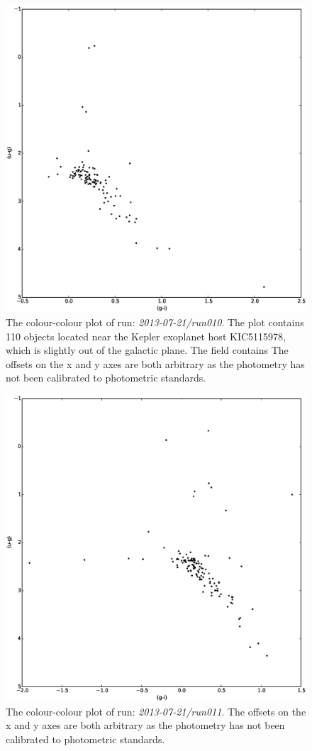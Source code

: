 \begin{figure}
\centering
\includegraphics[width=120mm]{images/2013-07-21-run010-2colour.eps}
\caption{The colour-colour plot of run: \emph{2013-07-21/run010}. The plot contains 110 objects located near the Kepler exoplanet host KIC5115978, which is slightly out of the galactic plane. The field contains The offsets on the x and y axes are both arbitrary as the photometry has not been calibrated to photometric standards.}
\label{fig:differentialtrad}
\end{figure}

\begin{figure}
\centering
\includegraphics[width=120mm]{images/2013-07-21-run011-2colour.eps}
\caption{The colour-colour plot of run: \emph{2013-07-21/run011}. The offsets on the x and y axes are both arbitrary as the photometry has not been calibrated to photometric standards.}
\label{fig:differentialtrad}
\end{figure}


